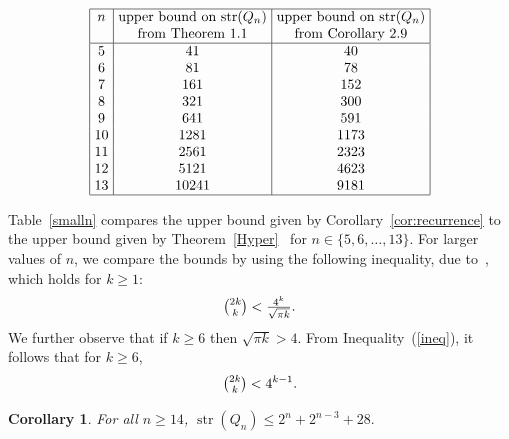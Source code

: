 \documentclass[12pt]{article}
\newtheorem{corollary}[theorem]{Corollary}
\DeclareMathOperator{\str}{str}
\begin{document}
\begin{table}[h]
\[
\setlength\arraycolsep{3.5pt}
\begin{array}{|c|c|c|}
\hline
n & \text{upper bound on $\str(Q_n)$} & \text{upper bound on $\str(Q_n)$} \\
~ & \text{from Theorem 1.1} &  \text{from Corollary 2.9} \\
\hline
5 & 41 & 40 \\
6 & 81 & 78 \\
7 & 161 & 152 \\
8 & 321 & 300 \\
9 & 641 & 591 \\
10 & 1281 & 1173 \\
11 & 2561 & 2323 \\
12 & 5121 & 4623 \\
13 & 10241 & 9181 \\
 \hline
\end{array}
\]
\caption{Comparison of upper bounds for small values of $n$.}\label{smalln}\end{table}

Table~\ref{smalln} compares the upper bound given by Corollary~\ref{cor:recurrence} to the upper bound given by Theorem~\ref{Hyper}~\cite{I.2018} for $n \in \{5,6,\dots,13\}$.  For larger values of $n$, we compare the bounds by using the following inequality, due to~\cite{Wallis}, which holds for $k \geq 1$: \begin{equation}\label{ineq}\tbinom{2k}{k} < \tfrac{4^k}{\sqrt{\pi k}}.\end{equation} We further observe that if $k \geq 6$ then $\sqrt{\pi k} > 4$. From Inequality~(\ref{ineq}), it follows that for $k \geq 6$, \begin{equation}\label{ineq6} \tbinom{2k}{k} < 4^{k-1}.\end{equation}

\begin{corollary}\label{cor:last} For all $n \geq 14$, $\str(Q_{n}) \leq 2^{n}+2^{n-3}+28.$ \end{corollary}
\end{document}

